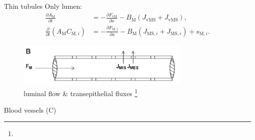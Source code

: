 \documentclass[serif]{beamer}
\begin{document}
\begin{frame}{Thin tubules}
    Only lumen:
    \begin{align}
        \frac{\partial A_\mathrm{M}}{\partial t} &= -\frac{\partial F_\mathrm{vM}}{\partial x}-B_\mathrm{M}\left(J_\mathrm{vMS}+J_\mathrm{vMS}\right),\\
        \frac{\partial }{\partial t}\left(A_\mathrm{M}C_{\mathrm{M},i}\right) &= -\frac{\partial F_{\mathrm{M},i}}{\partial x}-B_\mathrm{M}\left(J_{\mathrm{MS},i}+J_{\mathrm{MS},i}\right)+s_{\mathrm{M},i}.
    \end{align}
    \begin{figure}
        \centering
        \includegraphics[width=0.75\textwidth]{figures/thin_tubule.png}    
        \caption{luminal flow \& transepithelial fluxes \citep{Weinstein2015}\footnote[frame,1]{\tiny{}}}
    \end{figure}
\end{frame}

\begin{frame}{Blood vessels (C)}
\end{frame}
\end{document}
